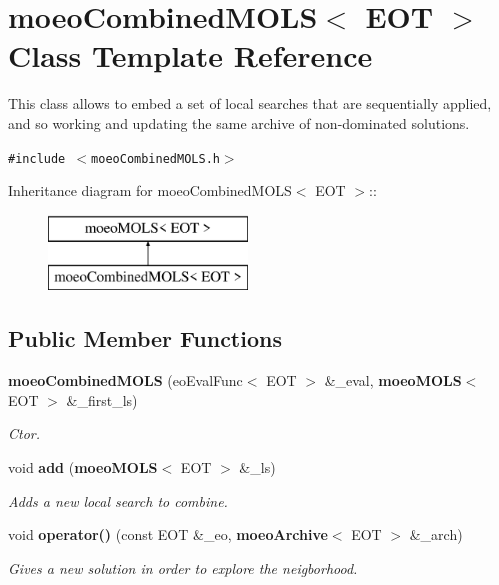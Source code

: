 \section{moeo\-Combined\-MOLS$<$ EOT $>$ Class Template Reference}
\label{classmoeoCombinedMOLS}
This class allows to embed a set of local searches that are sequentially applied, and so working and updating the same archive of non-dominated solutions.  


{\tt \#include $<$moeo\-Combined\-MOLS.h$>$}

Inheritance diagram for moeo\-Combined\-MOLS$<$ EOT $>$::\begin{figure}[H]
\begin{center}
\leavevmode
\includegraphics[height=2cm]{classmoeoCombinedMOLS}
\end{center}
\end{figure}
\subsection*{Public Member Functions}
\begin{CompactItemize}
\item 
{\bf moeo\-Combined\-MOLS} (eo\-Eval\-Func$<$ EOT $>$ \&\_\-eval, {\bf moeo\-MOLS}$<$ EOT $>$ \&\_\-first\_\-ls)
\begin{CompactList}\small\item\em Ctor. \item\end{CompactList}\item 
void {\bf add} ({\bf moeo\-MOLS}$<$ EOT $>$ \&\_\-ls)
\begin{CompactList}\small\item\em Adds a new local search to combine. \item\end{CompactList}\item 
void {\bf operator()} (const EOT \&\_\-eo, {\bf moeo\-Archive}$<$ EOT $>$ \&\_\-arch)
\begin{CompactList}\small\item\em Gives a new solution in order to explore the neigborhood. \item\end{CompactList}\end{CompactItemize}
